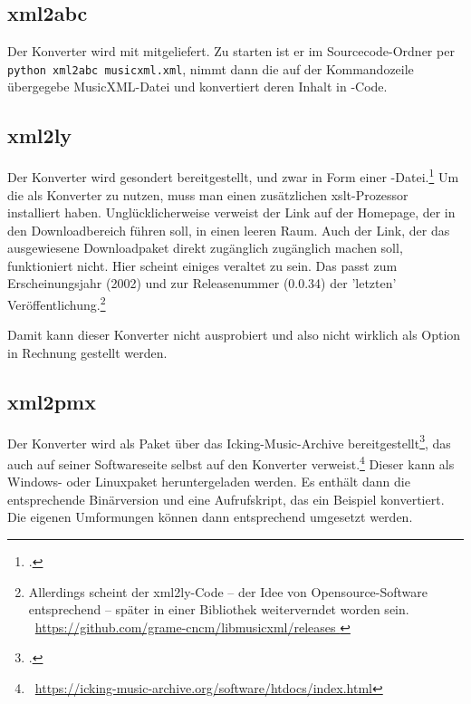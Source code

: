 \subsection{xml2abc}

Der Konverter  wird mit  mitgeliefert. Zu starten ist
er im Sourcecode-Ordner per \texttt{python xml2abc musicxml.xml}, nimmt dann die
auf der Kommandozeile übergegebe MusicXML-Datei und konvertiert deren Inhalt 
in -Code.

\subsection{xml2ly}

Der Konverter  wird gesondert bereitgestellt, und zwar in Form einer
-Datei.\footcite[vgl.][\nopage wp.]{xml2ly2019a} Um die als Konverter zu
nutzen, muss man einen zusätzlichen xslt-Prozessor installiert haben.
Unglücklicherweise verweist der Link auf der Homepage, der in den
Downloadbereich führen soll, in einen leeren Raum. Auch der Link, der das
ausgewiesene Downloadpaket direkt zugänglich zugänglich machen soll,
funktioniert nicht. Hier scheint einiges veraltet zu sein. Das passt zum
Erscheinungsjahr (2002) und zur Releasenummer (0.0.34) der 'letzten'
Veröffentlichung.\footnote{Allerdings scheint der xml2ly-Code -- der Idee von
Opensource-Software entsprechend -- später in einer Bibliothek weiterverndet
worden sein. \ra\
\href{https://github.com/grame-cncm/libmusicxml/releases}{https://github.com/grame-cncm/libmusicxml/releases
}}

Damit kann dieser Konverter nicht ausprobiert und also nicht wirklich als Option
in Rechnung gestellt werden. 

\subsection{xml2pmx}

Der Konverter  wird als Paket über das Icking-Music-Archive
bereitgestellt\footcite[vgl.][\nopage wp.]{xml2pmx2019a}, das auch auf seiner
Softwareseite selbst auf den Konverter verweist.\footnote{\ra\
\href{https://icking-music-archive.org/software/htdocs/index.html}
{https://icking-music-archive.org/software/htdocs/index.html}} Dieser kann als
Windows- oder Linuxpaket heruntergeladen werden. Es enthält dann die
entsprechende Binärversion und eine Aufrufskript, das ein Beispiel konvertiert.
Die eigenen Umformungen können dann entsprechend umgesetzt werden.

%
